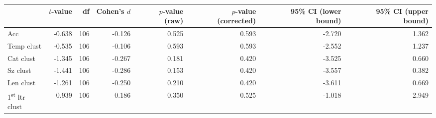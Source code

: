 \begin{tabular}{lrrrrrrr}
\toprule
 & $t$-value & df & Cohen's $d$ & $p$-value (raw) & $p$-value (corrected) & 95\% CI (lower bound) & 95\% CI (upper bound) \\
\midrule
 Acc & -0.638 & 106 & -0.126 & 0.525 & 0.593 & -2.720 & 1.362 \\
 Temp clust & -0.535 & 106 & -0.106 & 0.593 & 0.593 & -2.552 & 1.237 \\
 Cat clust & -1.345 & 106 & -0.267 & 0.181 & 0.420 & -3.525 & 0.660 \\
 Sz clust & -1.441 & 106 & -0.286 & 0.153 & 0.420 & -3.557 & 0.382 \\
 Len clust & -1.261 & 106 & -0.250 & 0.210 & 0.420 & -3.611 & 0.669 \\
 1\textsuperscript{st} ltr clust & 0.939 & 106 & 0.186 & 0.350 & 0.525 & -1.018 & 2.949 \\
\bottomrule
\end{tabular}